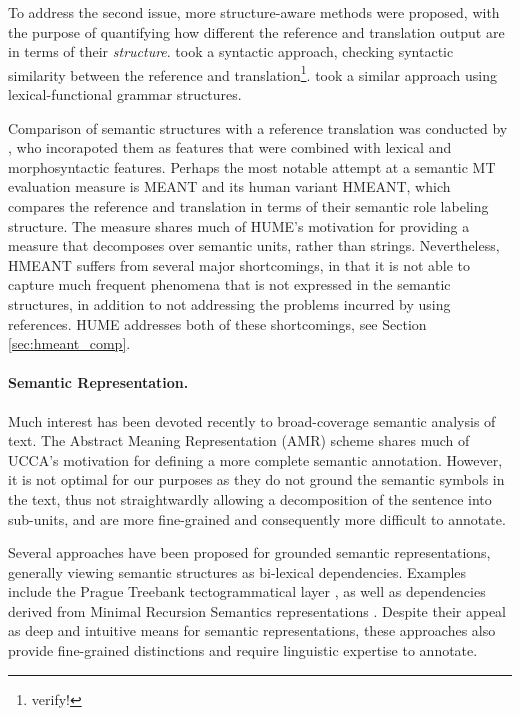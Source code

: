 \documentclass[11pt]{article}
\newcommand{\secref}[1]{Section \ref{#1}}
\newcommand{\oa}[1]{\footnote{\color{red} #1}}
\begin{document}
To address the second issue, more structure-aware methods were proposed, with the
purpose of quantifying how different the reference and translation output are in terms
of their {\it structure}.  took a syntactic approach, checking
syntactic similarity between the reference and translation\oa{verify!}. 
took a similar approach using lexical-functional grammar structures.

Comparison of semantic structures with a reference translation
was conducted by ,
who incorapoted them as features that were combined with lexical and morphosyntactic features.
Perhaps the most notable attempt at a semantic MT evaluation measure is MEANT \cite{lo2011meant} and
its human variant HMEANT, which compares the reference and translation in terms of their semantic
role labeling structure. The measure shares much of HUME's motivation for providing a measure that
decomposes over semantic units, rather than strings. Nevertheless, HMEANT suffers from several major
shortcomings, in that it is not able to capture much frequent phenomena that is not expressed
in the semantic structures, in addition to not addressing the problems incurred by using references.
HUME addresses both of these shortcomings, see \secref{sec:hmeant_comp}. 

\paragraph{Semantic Representation.}
Much interest has been devoted recently to broad-coverage semantic analysis of text.
The Abstract Meaning Representation (AMR) scheme \cite{banarescu2013abstract}
shares much of UCCA's motivation for defining a more complete semantic annotation.
However, it is not optimal for our purposes as they do not ground the semantic symbols
in the text, thus not straightwardly allowing a decomposition of the sentence into sub-units,
and are more fine-grained and consequently more difficult to annotate.

Several approaches have been proposed for grounded semantic representations,
generally viewing semantic structures as bi-lexical dependencies. Examples include
the Prague Treebank tectogrammatical layer \cite{hajic2012announcing}, as well as dependencies derived
from Minimal Recursion Semantics representations \cite{oepen2006discriminant}.
Despite their appeal as deep and intuitive means for semantic representations,
these approaches also provide fine-grained distinctions and require linguistic expertise to annotate.
\end{document}
